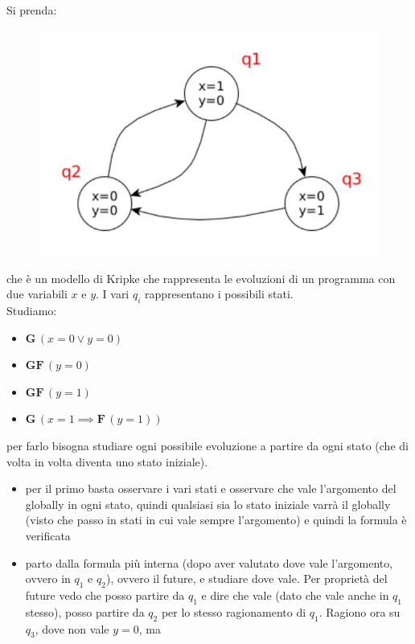 \documentclass[a4paper,12pt, oneside]{book}
\begin{document}
\begin{esempio}
  Si prenda:
  \begin{figure}[H]
    \centering
    \includegraphics[scale = 0.4]{img/kri.jpg}
  \end{figure}
  che è un modello di Kripke che rappresenta le evoluzioni di un programma con
  due variabili $x$ e $y$. I vari $q_i$ rappresentano i possibili stati.\\
  Studiamo:
  \begin{itemize}
    \item $\mathbf{G}\,(x=0\lor y=0)$
    \item $\mathbf{GF}\,(y=0)$
    \item $\mathbf{GF}\,(y=1)$
    \item $\mathbf{G}\,(x=1\implies \mathbf{F}\,(y=1))$
  \end{itemize}
  per farlo bisogna studiare ogni possibile evoluzione a partire da ogni stato
  (che di volta in volta diventa uno stato iniziale).
  \begin{itemize}
    \item per il primo basta osservare i vari stati e osservare che vale
    l'argomento del globally in ogni stato, quindi qualsiasi sia lo stato
    iniziale varrà il globally (visto che passo in stati in cui vale sempre
    l'argomento) e quindi la formula è verificata
    \item parto dalla formula più interna (dopo aver valutato dove vale
    l'argomento, ovvero in $q_1$ e $q_2$), ovvero il future, e studiare dove
    vale. Per proprietà del future vedo che posso partire da $q_1$ e dire che
    vale (dato che vale anche in $q_1$ stesso), posso partire da $q_2$ per lo
    stesso ragionamento di $q_1$. Ragiono ora su $q_3$, dove non vale $y=0$, ma

\end{itemize}
\end{esempio}
\end{document}
